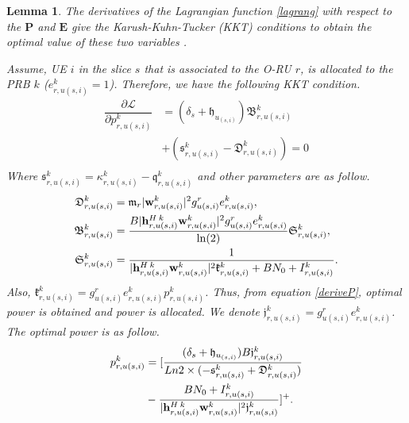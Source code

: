 \documentclass[conference]{IEEEtran}
\newtheorem{lemma}{Lemma}
\begin{document}
\begin{lemma}

The derivatives of the Lagrangian function \eqref{lagrang} with respect to the $\boldsymbol{P}$ and $\boldsymbol{E}$ give the Karush-Kuhn-Tucker (KKT) conditions to obtain the optimal value of these two variables \cite{lee2018dynamic,ali2018joint}.

Assume, UE $i$ in the slice $s$ that is associated to the O-RU $r$, is allocated to the PRB $k$  ($e_{r,u(s,i)}^{k} = 1$). Therefore, we have the following KKT condition. 
\begin{equation}\label{deriveP}
\begin{split}
\dfrac{\partial\mathcal{L}}{\partial p_{r,u(s,i)}^{k}} &= (\delta_s + \mathfrak{h}_{u_{(s,i)}})\mathfrak{B}_{r,u(s,i)}^{k}\\
 &+ (\mathfrak{s}^k_{r,u(s,i)} -\mathfrak{D}_{r,u(s,i)}^{k})=0\\
\end{split}
\end{equation}
Where $ \mathfrak{s}^k_{r,u(s,i)}=\kappa^k_{r,u(s,i)}-\mathfrak{q}^k_{r,u(s,i)}$ and other parameters are as follow.
\begin{equation}
\begin{split}
\mathfrak{D}_{r,u(s,i)}^{k} &= \mathfrak{m}_{r}|\bold{w}_{r,u(s,i)}^{k}|^2 g_{u(s,i)}^r e^k_{r,u(s,i)}, \\
\mathfrak{B}_{r,u(s,i)}^{k} &= \frac{B |{\bold{h}_{r,u(s,i)}^{H \: k}} \bold{w}_{r,u(s,i)}^{k}|^2 g_{u(s,i)}^r e_{r,u(s,i)}^{k}}{\ln(2)} \mathfrak{S}_{r,u(s,i)}^{k},\\
\mathfrak{S}_{r,u(s,i)}^{k} &= \frac{1}{{|\bold{h}_{r,u(s,i)}^{H \: k}} \bold{w}_{r,u(s,i)}^{k}|^2 \mathfrak{k}_{r,u(s,i)}^{k}+BN_0 + I_{r,u(s,i)}^{k}}.\\
\end{split}
\end{equation}
Also, $\mathfrak{k}_{r,u(s,i)}^{k} = g_{u(s,i)}^r e_{r,u(s,i)}^{k}p_{r,u(s,i)}^{k}$.
Thus, from equation \eqref{deriveP}, optimal power is obtained and power is allocated.
We denote $ \mathfrak{j}_{r,u(s,i)}^{k} = g_{u(s,i)}^r e_{r,u(s,i)}^{k}$.
The optimal power is as follow.
\begin{equation}
\begin{split}
p_{r,u(s,i)}^{k} &= [\frac{(\delta_s + \mathfrak{h}_{u_{(s,i)}})B \mathfrak{j}_{r,u(s,i)}^{k}}{ Ln2 \times (-\mathfrak{s}^k_{r,u(s,i)} +\mathfrak{D}_{r,u(s,i)}^{k})}\\
 &-\frac{BN_0 + I_{r,u(s,i)}^{k}}{{|\bold{h}_{r,u(s,i)}^{H \: k}} \bold{w}_{r,u(s,i)}^{k}|^2\mathfrak{j}_{r,u(s,i)}^{k}}]^+.\\

\end{split}
\end{equation}
\end{lemma}
\end{document}
